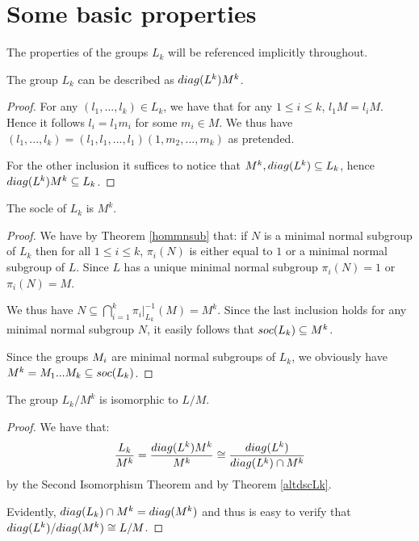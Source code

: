 \section{Some basic properties}
The properties of the groups \(L_k\) will be referenced implicitly throughout.


\begin{theorem}
    \label{altdscLk}
     The group $L_k$ can be described as $\diag{L^{k}}M^{k}$.
\end{theorem}

\begin{proof}
    For any $(l_1,...,l_k) \in L_k$, we have that for any $1 \le i \le k$, $l_1M = l_iM$. Hence it follows $l_i = l_1m_i$ for some $m_i \in M$. We thus have $(l_1,...,l_k) = (l_1,l_1,...,l_1)(1,m_2,...,m_k)$ as pretended. 
    
    For the other inclusion it suffices to notice that $M^k, \diag{L^k} \subseteq L_k$, hence $\diag{L^k}M^k \subseteq L_k$.
\end{proof}

\begin{theorem}
    The socle of $L_k$ is $M^k$.
\end{theorem}

\begin{proof}
    We have by Theorem \ref{hommnsub} that: if $N$ is a minimal normal subgroup of $L_k$ then for all $1 \le i \le k$, $\pi_i(N)$ is either equal to $1$ or a minimal normal subgroup of $L$. Since $L$ has a unique minimal normal subgroup $\pi_i(N) = 1$ or $\pi_i(N) = M$.
    
    We thus have $N \subseteq \bigcap_{i=1}^{k} \pi_i|_{L_k}^{-1}(M) = M^{k}$. Since the last inclusion holds for any minimal normal subgroup $N$, it easily follows that $\soc{L_k} \subseteq M^k$.

    Since the groups $\Mi$ are minimal normal subgroups of $L_k$, we obviously have $M^k=\Mi[1]...\Mi[k] \subseteq \soc{L_k}$.
\end{proof}

\begin{theorem}
    \label{qtLksoc}
    The group $L_k/M^k$ is isomorphic to $L/M$.
\end{theorem}

\begin{proof}
    We have that:
    $$
        \frac{L_k}{M^k}=\frac{\diag{L^k}M^k}{M^k} \cong \frac{\diag{L^k}}{\diag{L^k} \cap M^k}
    $$
    by the Second Isomorphism Theorem and by Theorem \ref{altdscLk}. 
    
    Evidently, $\diag{L_k} \cap M^k = \diag{M^k}$ and thus is easy to verify that $\diag{L^k}/\diag{M^k} \cong L/M$.
\end{proof}

